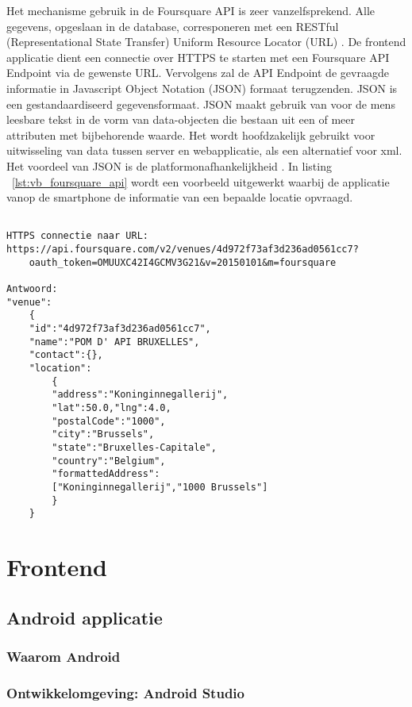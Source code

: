 Het mechanisme gebruik in de Foursquare API is zeer vanzelfsprekend. Alle gegevens, opgeslaan in de database, corresponeren met een RESTful (Representational State Transfer) Uniform Resource Locator (URL)  \cite{FS_API_website}. De frontend applicatie dient een connectie over HTTPS te starten met een Foursquare API Endpoint via de gewenste URL. Vervolgens zal de API Endpoint de gevraagde informatie in Javascript Object Notation (JSON) formaat terugzenden. JSON is een gestandaardiseerd gegevensformaat. JSON maakt gebruik van voor de mens leesbare tekst in de vorm van data-objecten die bestaan uit een of meer attributen met bijbehorende waarde. Het wordt hoofdzakelijk gebruikt voor uitwisseling van data tussen server en webapplicatie, als een alternatief voor xml. Het voordeel van JSON is de platformonafhankelijkheid \cite{JSON_def}. In listing ~\ref{lst:vb_foursquare_api} wordt een voorbeeld uitgewerkt waarbij de applicatie vanop de smartphone de informatie van een bepaalde locatie opvraagd.


\begin{lstlisting}[caption={Voorbeeld: werking Foursquare API},label=lst:vb_foursquare_api]

HTTPS connectie naar URL:
https://api.foursquare.com/v2/venues/4d972f73af3d236ad0561cc7?
	oauth_token=OMUUXC42I4GCMV3G21&v=20150101&m=foursquare

Antwoord:
"venue":
	{
	"id":"4d972f73af3d236ad0561cc7",
	"name":"POM D' API BRUXELLES",
	"contact":{},
	"location":
		{
		"address":"Koninginnegallerij",
		"lat":50.0,"lng":4.0,
		"postalCode":"1000",
		"city":"Brussels",
		"state":"Bruxelles-Capitale",
		"country":"Belgium",
		"formattedAddress":
		["Koninginnegallerij","1000 Brussels"]
		}
	}
\end{lstlisting}
 


\section{Frontend}
\subsection{Android applicatie}
\subsubsection{Waarom Android}
% 
\subsubsection{Ontwikkelomgeving: Android Studio}
